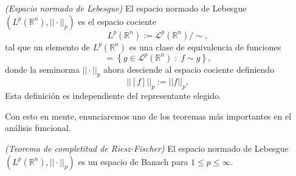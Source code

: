         \begin{definition*}
            \textit{(Espacio normado de Lebesgue)} El espacio  normado de Lebesgue $\left(L^p\left(\mathbb{R}^n \right), ||\cdot||_p \right)$ es el espacio cociente
            \begin{equation*}
                L^p\left(\mathbb{R}^n\right) := \mathcal{L}^p\left(\mathbb{R}^n\right) \text{/} \sim,
            \end{equation*}
            tal que un elemento de $L^p\left(\mathbb{R}^n\right)$ es una clase de equivalencia de funciones
            \begin{equation*}
                [f] = \left\{g \in \mathcal{L}^p\left(\mathbb{R}^n\right)\;:\; f \sim g\right\},
            \end{equation*}
            donde la seminorma $||\cdot||_p$ ahora desciende al espacio cociente definiendo
            \begin{equation*}
                \left| \left| [f] \right| \right|_p := ||f||_p,
            \end{equation*}
            Esta definición es independiente del representante elegido.
        \end{definition*}
        
        Con esto en mente, enunciaremos uno de los teoremas \citep{brezis2011functional} más importantes en el análisis funcional.
        \begin{theorem*}
            \textit{(Teorema de completitud de Riesz-Fischer)} El espacio normado de Lebesgue $\left(L^p\left(\mathbb{R}^n \right), ||\cdot||_p \right)$ es un espacio de Banach para $1 \leq p \leq \infty$.
        \end{theorem*}

